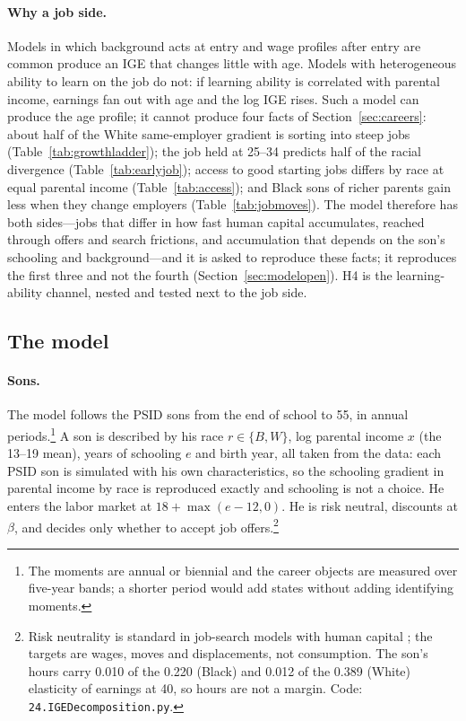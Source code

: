 \paragraph{Why a job side.} Models in which background acts at entry and wage profiles after entry are common
\citep[e.g.][]{lee2019intergenerational, caucutt2020early, abbott2019education} produce an IGE that changes little with
age. Models with heterogeneous ability to learn on the job \citep{huggett2011sources} do not: if learning ability is
correlated with parental income, earnings fan out with age and the log IGE rises. Such a model can produce the age
profile; it cannot produce four facts of Section~\ref{sec:careers}: about half of the White same-employer gradient is
sorting into steep jobs (Table~\ref{tab:growthladder}); the job held at 25--34 predicts half of the racial divergence
(Table~\ref{tab:earlyjob}); access to good starting jobs differs by race at equal parental income
(Table~\ref{tab:access}); and Black sons of richer parents gain less when they change employers
(Table~\ref{tab:jobmoves}). The model therefore has both sides---jobs that differ in how fast human capital accumulates,
reached through offers and search frictions, and accumulation that depends on the son's schooling and background---and
it is asked to reproduce these facts; it reproduces the first three and not the fourth (Section~\ref{sec:modelopen}). H4
is the learning-ability channel, nested and tested next to the job side.

\subsection{The model}

\paragraph{Sons.} The model follows the PSID sons from the end of school to 55, in annual periods.\footnote{The
moments are annual or biennial and the career objects are measured over five-year bands; a shorter period would add
states without adding identifying moments.} A son is described by his race $r \in \{B, W\}$, log parental income $x$
(the 13--19 mean), years of schooling $e$ and birth year, all taken from the data: each PSID son is simulated with his
own characteristics, so the schooling gradient in parental income by race is reproduced exactly and schooling is not a
choice. He enters the labor market at $18 + \max(e - 12, 0)$. He is risk neutral, discounts at $\beta$, and decides only
whether to accept job offers.\footnote{Risk neutrality is standard in job-search models with human capital
\citep[e.g.][]{bagger2014tenure}; the targets are wages, moves and displacements, not consumption. The son's hours carry
0.010 of the 0.220 (Black) and 0.012 of the 0.389 (White) elasticity of earnings at 40, so hours are not a margin. Code:
\texttt{24.IGEDecomposition.py}.}

